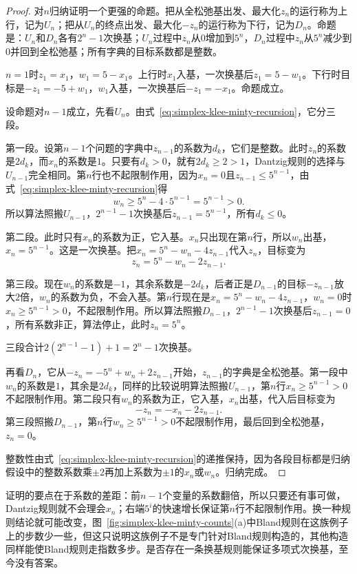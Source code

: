 \begin{proof}
 对$n$归纳证明一个更强的命题。把从全松弛基出发、最大化$z_n$的运行称为上行，记为$U_n$；把从$U_n$的终点出发、最大化$-z_n$的运行称为下行，记为$D_n$。命题是：$U_n$和$D_n$各有$2^n-1$次换基；$U_n$过程中$z_n$从$0$增加到$5^n$，$D_n$过程中$z_n$从$5^n$减少到$0$并回到全松弛基；所有字典的目标系数都是整数。

 $n=1$时$z_1=x_1$，$w_1=5-x_1$。上行时$x_1$入基，一次换基后$z_1=5-w_1$。下行时目标是$-z_1=-5+w_1$，$w_1$入基，一次换基后$-z_1=-x_1$。命题成立。

 设命题对$n-1$成立，先看$U_n$。由式~\eqref{eq:simplex-klee-minty-recursion}，它分三段。

 第一段。设第$n-1$个问题的字典中$z_{n-1}$的系数为$d_k$，它们是整数。此时$z_n$的系数是$2d_k$，而$x_n$的系数是$1$。只要有$d_k>0$，就有$2d_k\geq2>1$，Dantzig规则的选择与$U_{n-1}$完全相同。第$n$行也不起限制作用，因为$x_n=0$且$z_{n-1}\leq5^{n-1}$，由式~\eqref{eq:simplex-klee-minty-recursion}得
 \[
  w_n\geq5^n-4\cdot5^{n-1}=5^{n-1}>0.
 \]
 所以算法照搬$U_{n-1}$，$2^{n-1}-1$次换基后$z_{n-1}=5^{n-1}$，所有$d_k\leq0$。

 第二段。此时只有$x_n$的系数为正，它入基。$x_n$只出现在第$n$行，所以$w_n$出基，$x_n=5^{n-1}$。这是一次换基。把$x_n=5^n-w_n-4z_{n-1}$代入$z_n$，目标变为
 \[
  z_n=5^n-w_n-2z_{n-1}.
 \]

 第三段。现在$w_n$的系数是$-1$，其余系数是$-2d_k$，后者正是$D_{n-1}$的目标$-z_{n-1}$放大$2$倍，$w_n$的系数为负，不会入基。第$n$行现在是$x_n=5^n-w_n-4z_{n-1}$，$w_n=0$时$x_n\geq5^{n-1}>0$，不起限制作用。所以算法照搬$D_{n-1}$，$2^{n-1}-1$次换基后$z_{n-1}=0$，所有系数非正，算法停止，此时$z_n=5^n$。

 三段合计$2(2^{n-1}-1)+1=2^n-1$次换基。

 再看$D_n$，它从$-z_n=-5^n+w_n+2z_{n-1}$开始，$z_{n-1}$的字典是全松弛基。第一段中$w_n$的系数是$1$，其余是$2d_k$，同样的比较说明算法照搬$U_{n-1}$，第$n$行$x_n\geq5^{n-1}>0$不起限制作用。第二段只有$w_n$的系数为正，它入基，$x_n$出基，代入后目标变为
 \[
  -z_n=-x_n-2z_{n-1}.
 \]
 第三段照搬$D_{n-1}$，第$n$行$w_n\geq5^{n-1}>0$不起限制作用，最后回到全松弛基，$z_n=0$。

 整数性由式~\eqref{eq:simplex-klee-minty-recursion}的递推保持，因为各段目标都是归纳假设中的整数系数乘$\pm2$再加上系数为$\pm1$的$x_n$或$w_n$。归纳完成。
\end{proof}

证明的要点在于系数的差距：前$n-1$个变量的系数翻倍，所以只要还有事可做，Dantzig规则就不会理会$x_n$；右端$5^i$的快速增长保证第$n$行不起限制作用。换一种规则结论就可能改变，图~\ref{fig:simplex-klee-minty-counts}(a)中Bland规则在这族例子上的步数少一些，但这只说明这族例子不是专门针对Bland规则构造的，其他构造同样能使Bland规则走指数多步。是否存在一条换基规则能保证多项式次换基，至今没有答案。

